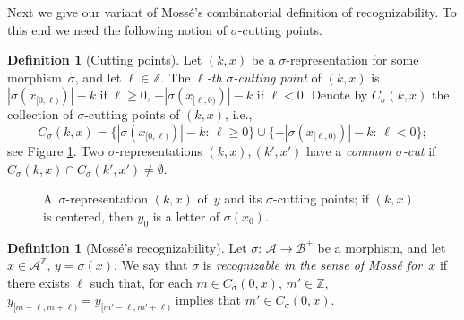 \documentclass{amsart}
\theoremstyle{definition}
\newtheorem{definition}[lemma]{Definition}
\theoremstyle{remark}
\numberwithin{equation}{section}
\begin{document}
Next we give our variant of Moss\'e's combinatorial definition of recognizability. To this end we need the following notion of $\sigma$-cutting points.

\begin{definition}[Cutting points]
Let $(k,x)$ be a $\sigma$-representation for some morphism~$\sigma$, and let $\ell \in \mathbb{Z}$.
The \emph{$\ell$-th $\sigma$-cutting point} of $(k,x)$ is $|\sigma(x_{[0,\ell)})|-k$ if $\ell \ge 0$, $-|\sigma(x_{[\ell,0)})|-k$ if $\ell < 0$. 
Denote by $C_\sigma(k,x)$ the collection of $\sigma$-cutting points of $(k,x)$, i.e., 
\[
C_\sigma(k,x) = \{|\sigma(x_{[0,\ell)})|-k:\, \ell \ge 0\} \cup \{-|\sigma(x_{[\ell,0)})|-k:\, \ell < 0\};
\]
see Figure \ref{Figure_1}.
Two $\sigma$-representations $(k,x), (k',x')$ have a \emph{common $\sigma$-cut} if $C_\sigma(k,x) \cap C_\sigma(k',x') \ne \emptyset$. 
\end{definition}

\begin{figure}[ht]
\caption{A~$\sigma$-representation $(k,x)$ of~$y$ and its $\sigma$-cutting points; if $(k,x)$ is centered, then $y_0$ is a letter of $\sigma(x_0)$.}
\label{Figure_1}
\end{figure}

 
\begin{definition}[Moss\'e's recognizability] \label{def:mossesadic}  
Let $\sigma:\, \mathcal{A} \to \mathcal{B}^+$ be a morphism, and let $x \in \mathcal{A}^\mathbb{Z}$, $y = \sigma(x)$. 
We say that $\sigma$ is \emph{recognizable in the sense of Moss\'{e} for~$x$} if there exists $\ell$ such that, for each $m \in C_\sigma(0,x)$, $m' \in \mathbb{Z}$, $y_{[m-\ell,m+\ell)} =  y_{[m'-\ell,m'+\ell)}$ implies that $m' \in C_\sigma(0,x)$.
\end{definition}
\end{document}
